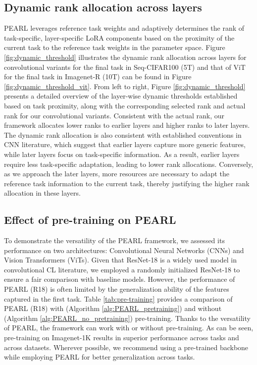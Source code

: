 \documentclass[10pt]{article} %
\begin{document}
\subsection{Dynamic rank allocation across layers} 
 PEARL leverages reference task weights and adaptively determines the rank of task-specific, layer-specific LoRA components based on the proximity of the current task to the reference task weights in the parameter space. Figure \ref{fig:dynamic_threshold} illustrates the dynamic rank allocation across layers for convolutional variants for the final task in Seq-CIFAR100 (5T) and that of ViT for the final task in Imagenet-R (10T) can be found in Figure \ref{fig:dynamic_threshold_vit}. From left to right, Figure \ref{fig:dynamic_threshold} presents a detailed overview of the layer-wise dynamic thresholds established based on task proximity, along with the corresponding selected rank and actual rank for our convolutional variants. Consistent with the actual rank, our framework allocates lower ranks to earlier layers and higher ranks to later layers. The dynamic rank allocation is also consistent with established conventions in CNN literature, which suggest that earlier layers capture more generic features, while later layers focus on task-specific information. As a result, earlier layers require less task-specific adaptation, leading to lower rank allocations. Conversely, as we approach the later layers, more resources are necessary to adapt the reference task information to the current task, thereby justifying the higher rank allocation in these layers.





\subsection{Effect of pre-training on PEARL}
To demonstrate the versatility of the PEARL framework, we assessed its performance on two architectures:
Convolutional Neural Networks (CNNs) and Vision Transformers (ViTs). Given that ResNet-18 is a widely used model in convolutional CL literature, we employed a randomly initialized ResNet-18 to ensure a fair comparison with baseline models. However, the performance of PEARL (R18) is often limited by the generalization ability of the features captured in the first task. Table \ref{tab:pre-training} provides a comparison of PEARL (R18) with (Algorithm \ref{alg:PEARL_pretraining}) and without (Algorithm \ref{alg:PEARL_no_pretraining}) pre-training.  Thanks to the versatility of PEARL, the framework can work with or without pre-training. As can be seen, pre-training on Imagenet-1K results in superior performance across tasks and across datasets. Wherever possible, we recommend using a pre-trained backbone while employing PEARL for better generalization across tasks. 
\end{document}
